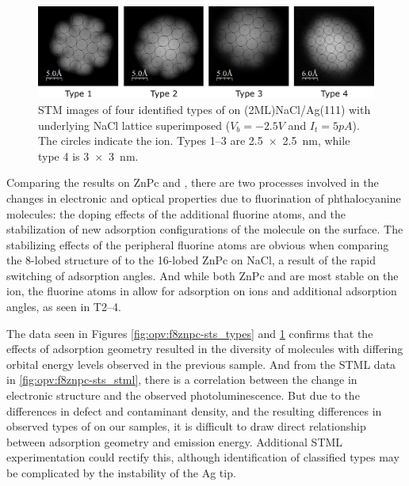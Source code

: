 \begin{figure} [h]
    \centering
        \includegraphics[width=\textwidth]{pictures/4types_atomic.png}
    \caption{STM images of four identified types of  on (2ML)NaCl/Ag(111) with underlying NaCl lattice superimposed ($V_b = -2.5V$ and $I_t = 5pA$). The circles indicate the  ion. Types 1--3 are \SI{2.5x2.5}{nm}, while type 4 is \SI{3x3}{nm}.  }
    \label{fig:opv:f8znpc-atomic_types}
\end{figure}


Comparing the results on ZnPc and , there are two processes involved in the changes in electronic and optical properties due to fluorination of phthalocyanine molecules: the doping effects of the additional fluorine atoms, and the stabilization of new adsorption configurations of the molecule on the surface. The stabilizing effects of the peripheral fluorine atoms are obvious when comparing the 8-lobed structure of  to the 16-lobed ZnPc on NaCl, a result of the rapid switching of adsorption angles. And while both ZnPc and  are most stable on the  ion, the fluorine atoms in  allow for adsorption on  ions and additional adsorption angles, as seen in T2--4.






The data seen in Figures \ref{fig:opv:f8znpc-sts_types} and \ref{fig:opv:f8znpc-atomic_types} confirms that the effects of adsorption geometry resulted in the diversity of molecules with differing orbital energy levels observed in the previous sample. And from the \ac{STML} data in \autoref{fig:opv:f8znpc-sts_stml}, there is a correlation between the change in electronic structure and the observed photoluminescence. But due to the differences in defect and contaminant density, and the resulting differences in observed types of  on our samples, it is difficult to draw direct relationship between adsorption geometry and emission energy. Additional \ac{STML} experimentation could rectify this, although identification of classified types may be complicated by the instability of the Ag tip.



